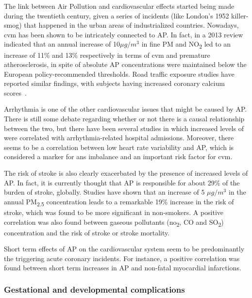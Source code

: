 The link between Air Pollution and cardiovascular effects started being
made during the twentieth century, given a series of incidents (like
London's 1952 killer-smog) that happened in the urban areas of
industrialized countries. Nowadays, \gls{cvm} has been shown to be
intricately connected to \gls{AP}. In fact, in a 2013 review indicated
that an annual increase of 10$\mu g / m^{3}$ in fine \gls{PM} and
NO\textsubscript{2} led to an increase of 11\% and 13\% respectively in
terms of \gls{cvm} and premature atherosclerosis, in spite of absolute
\gls{AP} concentrations were maintained below the European
policy-recommended thresholds. Road traffic exposure studies have
reported similar findings, with subjects having increased coronary
calcium scores~\cite{Bourdrel2017}.

Arrhythmia is one of the other cardiovascular issues that might be
caused by \gls{AP}. There is still some debate regarding whether or not
there is a causal relationship between the two, but there have been
several studies in which increased levels of  were
correlated with arrhythmia-related hospital admissions. Moreover, there
seems to be a correlation between low heart rate variability and
\gls{AP}, which is considered a marker for \gls{ans} imbalance and an
important risk factor for \gls{cvm}\cite{Bourdrel2017}.

The risk of stroke is also clearly exacerbated by the presence of
increased levels of \gls{AP}. In fact, it is currently thought that
\gls{AP} is responsible for about 29\% of the burden of stroke,
globally. Studies have shown that an increase of 5 $\mu g / m^{3}$ in
the annual \gls{PM}\textsubscript{2.5} concentration leads to a
remarkable 19\% increase in the risk of stroke, which was found to be
more significant in non-smokers. A positive correlation was also found
between gaseous pollutants (no\textsubscript{2}, CO and
SO\textsubscript{2}) concentration and the risk of stroke or stroke
mortality.

Short term effects of \gls{AP} on the cardiovascular system seem to be
predominantly the triggering acute coronary incidents. For instance, a
positive correlation was found between short term increases in \gls{AP}
and non-fatal myocardial infarctions.

\subsubsection{Gestational and developmental complications}%
\label{ssub:gestational_and_developmental_complications}

